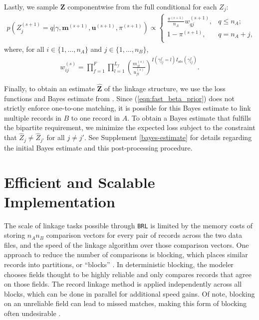 \documentclass[ba]{imsart}
\begin{document}
Lastly, we sample $\bm{Z}$ componentwise from the full conditional for each $Z_j$:
\begin{align}
	\label{eqn:z_full_conditional}
	p\left(Z_j^{(s+1)}  = q|\gamma, \bm{m}^{(s+1)}, \bm{u}^{(s+1)},  \pi^{(s+1)}\right) \propto
	\begin{cases} 
		\frac{\pi^{(s+1)}}{n_A} w_{qj}^{(s+1)},  & q \leq n_A; \\
		1 - \pi^{(s+1)}, & q  = n_A + j, \\
	\end{cases}
\end{align}
where, for all $i \in \{1, \ldots, n_A\}$ and $j \in \{1, \ldots, n_B\}$, 
\begin{align}
	\label{eqn:fs_weight}
	w_{ij}^{(s)} = \prod_{f=1}^{F}\prod_{l = 1}^{L_f} \left(\frac{m_{fl}^{(s)}}{u_{fl}^{(s)}}\right)^{I(\gamma_{ij}^f = l)I_{obs}(\gamma_{ij}^f)}.
\end{align}

Finally, to obtain an estimate $\hat{\bm{Z}}$ of the linkage structure, we use the loss functions and Bayes estimate from \cite{sadinle_bayesian_2017}. Since (\ref{eqn:fast_beta_prior}) does not strictly enforce one-to-one matching, it is possible for this Bayes estimate to link multiple records in $B$ to one record in $A$. To obtain a Bayes estimate that fulfills the bipartite requirement, we minimize the expected loss subject to the constraint that $\hat{Z}_j \neq \hat{Z}_{j'}$ for all $j \neq j'$. See Supplement \ref{bayes-estimate} for details regarding the initial Bayes estimate and this post-processing procedure.


\section{Efficient and Scalable Implementation}
\label{sec:efficiency}

The scale of linkage tasks possible through \texttt{BRL} is limited by the memory costs of storing $n_A  n_B$ comparison vectors for every pair of records across the two data files, and the speed of the linkage algorithm over those comparison vectors. One approach to reduce the number of comparisons is blocking, which places similar records into partitions, or ``blocks'' \citep{christen2019data}. In deterministic blocking, the modeler chooses fields thought to be highly reliable and only compares records that agree on those fields. The record linkage method is  applied independently across all blocks, which can be done in parallel for additional speed gains. Of note, blocking on an unreliable field can lead to missed matches, making this form of blocking often undesirable \citep{steorts_comparison_2014}.
\end{document}
